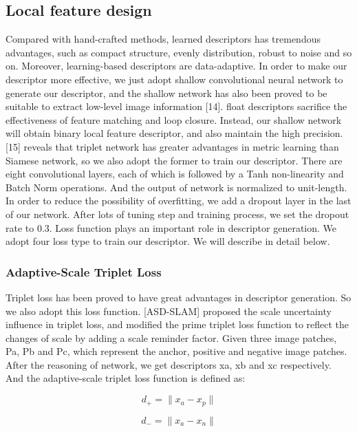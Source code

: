 \documentclass[letterpaper, 10 pt, conference]{ieeeconf}  %
\begin{document}
\subsection{Local feature design } 
Compared with hand-crafted methods, learned descriptors has tremendous advantages, such as compact structure, evenly distribution, robust to noise and so on. Moreover, learning-based descriptors are data-adaptive. In order to make our descriptor more effective, we just adopt shallow convolutional neural network to generate our descriptor, and the shallow network has also been proved to be suitable to extract low-level image information [14]. float descriptors sacrifice the effectiveness of feature matching and loop closure. Instead, our shallow network will obtain binary local feature descriptor, and also maintain the high precision.
	[15] reveals that triplet network has greater advantages in metric learning than Siamese network, so we also adopt the former to train our descriptor. There are eight convolutional layers, each of which is followed by a Tanh non-linearity and Batch Norm operations. And the output of network is normalized to unit-length. In order to reduce the possibility of overfitting, we add a dropout layer in the last of our network. After lots of tuning step and training process, we set the dropout rate to 0.3.
	Loss function plays an important role in descriptor generation. We adopt four loss type to train our descriptor. We will describe in detail below.

\subsubsection{Adaptive-Scale Triplet Loss} 
Triplet loss has been proved to have great advantages in descriptor generation. So we also adopt this loss function. [ASD-SLAM] proposed the scale uncertainty influence in triplet loss, and modified the prime triplet loss function to reflect the changes of scale by adding a scale reminder factor. Given three image patches, Pa, Pb and Pc, which represent the anchor, positive and negative image patches. After the reasoning of network, we get descriptors xa, xb and xc respectively. And the adaptive-scale triplet loss function is defined as:

\begin{equation}
d _{+} = \| x_{a} - x_{p}  \| 
\end{equation}

\begin{equation}
d _{-} = \| x_{a} - x_{n}  \| 
\end{equation}
\end{document}

